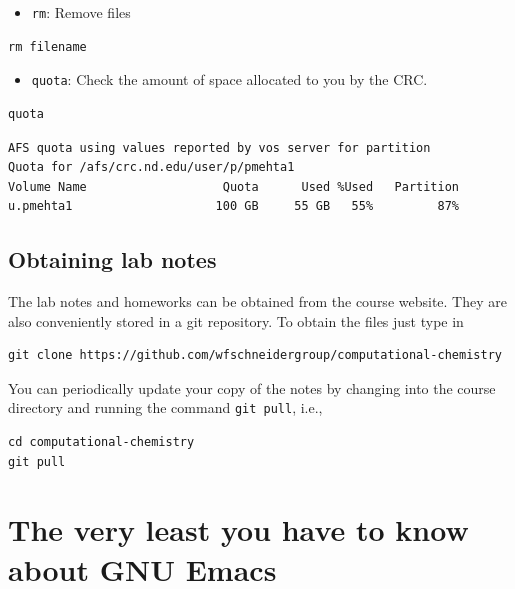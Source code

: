 \documentclass[11pt]{article}
\begin{document}
\begin{itemize}
\item \verb~rm~: Remove files
\end{itemize}
\begin{verbatim}
rm filename
\end{verbatim}

\begin{itemize}
\item \verb~quota~: Check the amount of space allocated to you by the CRC.
\end{itemize}

\begin{verbatim}
quota
\end{verbatim}

\begin{verbatim}
AFS quota using values reported by vos server for partition
Quota for /afs/crc.nd.edu/user/p/pmehta1 
Volume Name                   Quota      Used %Used   Partition
u.pmehta1                    100 GB     55 GB   55%         87%
\end{verbatim}


\subsection{Obtaining lab notes}
\label{sec-1-3}

The lab notes and homeworks can be obtained from the course website. They are also conveniently stored in a git repository. To obtain the files just type in

\begin{verbatim}
git clone https://github.com/wfschneidergroup/computational-chemistry
\end{verbatim}

You can periodically update your copy of the notes by changing into the course directory and running the command \verb~git pull~, i.e.,

\begin{verbatim}
cd computational-chemistry
git pull
\end{verbatim}


\section{The very least you have to know about GNU Emacs}
\label{sec-2}
\end{document}
